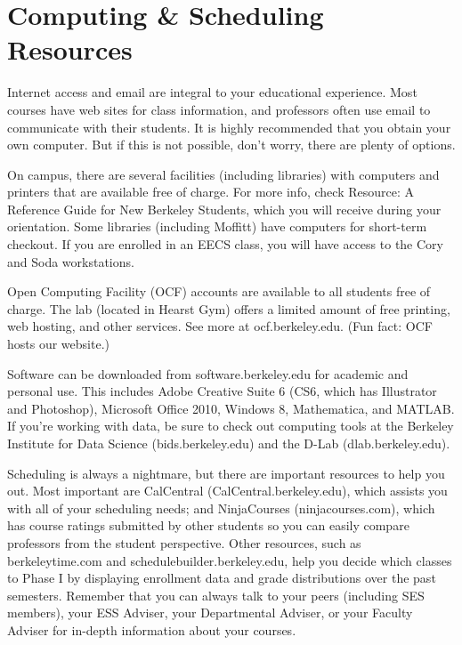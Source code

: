 \chapter*{Computing \& Scheduling Resources}

Internet access and email are integral to your educational experience. Most courses have web sites for class information, and professors often use email to communicate with their students. It is highly recommended that you obtain your own computer. But if this is not possible, don’t worry, there are plenty of options.

On campus, there are several facilities (including libraries) with computers and printers that are available free of charge. For more info, check Resource: A Reference Guide for New Berkeley Students, which you will receive during your orientation. Some libraries (including Moffitt) have computers for short-term checkout. If you are enrolled in an EECS class, you will have access to the Cory and Soda workstations.

Open Computing Facility (OCF) accounts are available to all students free of charge. The lab (located in Hearst Gym) offers a limited amount of free printing, web hosting, and other services. See more at {\selectfont ocf.berkeley.edu}. (Fun fact: OCF hosts our website.)

Software can be downloaded from {\selectfont software.berkeley.edu} for academic and personal use. This includes Adobe Creative Suite 6 (CS6, which has Illustrator and Photoshop), Microsoft Office 2010, Windows 8, Mathematica, and MATLAB. If you’re working with data, be sure to check out computing tools at the Berkeley Institute for Data Science ({\selectfont bids.berkeley.edu}) and the D-Lab ({\selectfont dlab.berkeley.edu}).

Scheduling is always a nightmare, but there are important resources to help you out. Most important are CalCentral ({\selectfont CalCentral.berkeley.edu}), which assists you with all of your scheduling needs; and NinjaCourses ({\selectfont ninjacourses.com}), which has course ratings submitted by other students so you can easily compare professors from the student perspective. Other resources, such as {\selectfont berkeleytime.com} and {\selectfont schedulebuilder.berkeley.edu}, help you decide which classes to Phase I by displaying enrollment data and grade distributions over the past semesters. Remember that you can always talk to your peers (including SES members), your ESS Adviser, your Departmental Adviser, or your Faculty Adviser for in-depth information about your courses.

